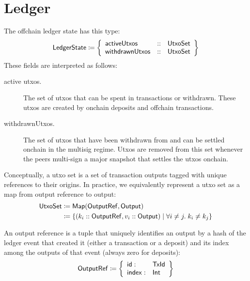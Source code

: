 \documentclass[../hydrozoa.tex]{subfiles}
\begin{document}
\section{Ledger}%
\label{h:offchain-ledger}

The offchain ledger state has this type:
\begin{equation*}
  \mathsf{LedgerState} \coloneq \left\{
  \begin{array}{lll}
    \mathsf{activeUtxos} &::& \mathsf{UtxoSet} \\
    \mathsf{withdrawnUtxos} &::& \mathsf{UtxoSet}
  \end{array}\right\}
\end{equation*}
These fields are interpreted as follows:
\begin{description}
  \item[active utxos.] The set of utxos that can be spent in transactions or withdrawn.
    These utxos are created by onchain deposits and offchain transactions.
  \item[withdrawnUtxos.] The set of utxos that have been withdrawn from  and can be settled onchain in the multisig regime.
    Utxos are removed from this set whenever the peers multi-sign a major snapshot that settles the utxos onchain.
\end{description}

Conceptually, a utxo set is a set of transaction outputs tagged with unique references to their origins.
In practice, we equivalently represent a utxo set as a map from output reference to output:
\begin{equation*}
\begin{split}
  \mathsf{UtxoSet} &\coloneq \mathsf{Map(OutputRef, Output)} \\
    &\coloneq \left\{
      (k_i :: \mathsf{OutputRef}, v_i :: \mathsf{Output})
      \;\middle|\;
      \forall i \neq j.\; k_i \neq k_j
    \right\}
\end{split}
\end{equation*}

An output reference is a tuple that uniquely identifies an output by a hash of the ledger event that created it (either a transaction or a deposit) and its index among the outputs of that event (always zero for deposits):
\begin{equation*}
    \mathsf{OutputRef} \coloneq \left\{
    \begin{array}{ll}
        \mathsf{id} : & \mathsf{TxId} \\
        \mathsf{index} : & \mathsf{Int}
    \end{array} \right\}
\end{equation*}
\end{document}
